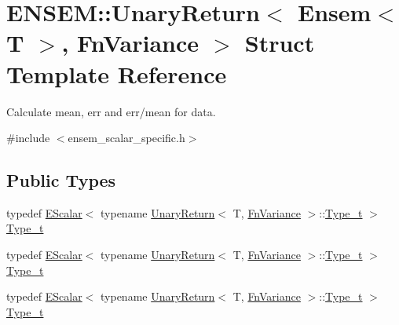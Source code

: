 \hypertarget{structENSEM_1_1UnaryReturn_3_01Ensem_3_01T_01_4_00_01FnVariance_01_4}{}\section{E\+N\+S\+EM\+:\+:Unary\+Return$<$ Ensem$<$ T $>$, Fn\+Variance $>$ Struct Template Reference}
\label{structENSEM_1_1UnaryReturn_3_01Ensem_3_01T_01_4_00_01FnVariance_01_4}


Calculate mean, err and err/mean for data.  




{\ttfamily \#include $<$ensem\+\_\+scalar\+\_\+specific.\+h$>$}

\subsection*{Public Types}
\begin{DoxyCompactItemize}
\item 
typedef \mbox{\hyperlink{classENSEM_1_1EScalar}{E\+Scalar}}$<$ typename \mbox{\hyperlink{structENSEM_1_1UnaryReturn}{Unary\+Return}}$<$ T, \mbox{\hyperlink{structENSEM_1_1FnVariance}{Fn\+Variance}} $>$\+::\mbox{\hyperlink{structENSEM_1_1UnaryReturn_3_01Ensem_3_01T_01_4_00_01FnVariance_01_4_ab460044d5646089e41eebeb2f5be9f33}{Type\+\_\+t}} $>$ \mbox{\hyperlink{structENSEM_1_1UnaryReturn_3_01Ensem_3_01T_01_4_00_01FnVariance_01_4_ab460044d5646089e41eebeb2f5be9f33}{Type\+\_\+t}}
\item 
typedef \mbox{\hyperlink{classENSEM_1_1EScalar}{E\+Scalar}}$<$ typename \mbox{\hyperlink{structENSEM_1_1UnaryReturn}{Unary\+Return}}$<$ T, \mbox{\hyperlink{structENSEM_1_1FnVariance}{Fn\+Variance}} $>$\+::\mbox{\hyperlink{structENSEM_1_1UnaryReturn_3_01Ensem_3_01T_01_4_00_01FnVariance_01_4_ab460044d5646089e41eebeb2f5be9f33}{Type\+\_\+t}} $>$ \mbox{\hyperlink{structENSEM_1_1UnaryReturn_3_01Ensem_3_01T_01_4_00_01FnVariance_01_4_ab460044d5646089e41eebeb2f5be9f33}{Type\+\_\+t}}
\item 
typedef \mbox{\hyperlink{classENSEM_1_1EScalar}{E\+Scalar}}$<$ typename \mbox{\hyperlink{structENSEM_1_1UnaryReturn}{Unary\+Return}}$<$ T, \mbox{\hyperlink{structENSEM_1_1FnVariance}{Fn\+Variance}} $>$\+::\mbox{\hyperlink{structENSEM_1_1UnaryReturn_3_01Ensem_3_01T_01_4_00_01FnVariance_01_4_ab460044d5646089e41eebeb2f5be9f33}{Type\+\_\+t}} $>$ \mbox{\hyperlink{structENSEM_1_1UnaryReturn_3_01Ensem_3_01T_01_4_00_01FnVariance_01_4_ab460044d5646089e41eebeb2f5be9f33}{Type\+\_\+t}}
\end{DoxyCompactItemize}


